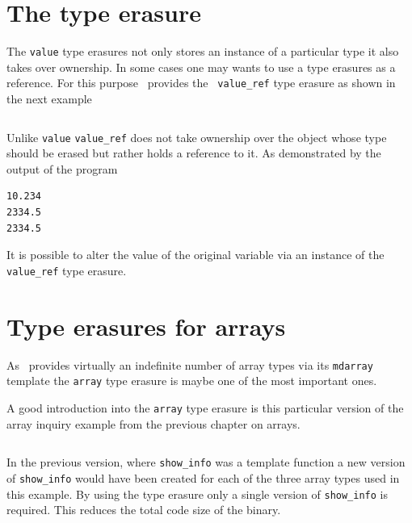 \section{The  type erasure}

The {\tt value} type erasures not only stores an instance of a particular
type it also takes over ownership. In some cases one may wants to use a type
erasures as a reference. For this purpose \libpnicore\ provides the {\tt
value\_ref} type erasure as shown in the next example

\inputminted[fontsize=\small,
             linenos,
             firstnumber=26,
             firstline=26,
             lastline=45,
             frame=lines,
             label=examples/type\_erasure2.cpp]
{cpp}{../examples/type_erasure2.cpp}
Unlike {\tt value} {\tt value\_ref} does not take ownership over the object
whose type should be erased but rather holds a reference to it. 
As demonstrated by the output of the program
\begin{verbatim}
10.234
2334.5
2334.5
\end{verbatim}
It is possible to alter the value of the original variable via an instance of
the {\tt value\_ref} type erasure.



\section{Type erasures for arrays}

As \libpnicore\ provides virtually an indefinite number of array types via its
{\tt mdarray} template the {\tt array} type erasure is maybe one of the most
important ones.

A good introduction into the {\tt array} type erasure is this particular version
of the array inquiry  example from the previous chapter on arrays. 
\inputminted[linenos,
             fontsize=\small,
             firstnumber=25,
             firstline=25,
             lastline=62,
             frame=lines,
             label=examples/type\_erasure3.cpp]
{cpp}{../examples/type_erasure3.cpp}
In the previous version, where {\tt show\_info} was a template function a new
version of {\tt show\_info} would have been created for each of the three array
types used in this example. By using the type erasure only a single version of
{\tt show\_info} is required. This reduces the total code size of the binary.


